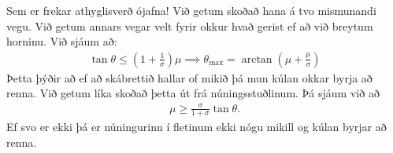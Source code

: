 \ifdefined \wholebook \else\documentclass[oneside]{book}\usepackage{EdlBook}\graphicspath{{figures/}}
\begin{document}
Sem er frekar athyglisverð ójafna! Við getum skoðað hana á tvo mismunandi vegu. Við getum annars vegar velt fyrir okkur hvað gerist ef að við breytum horninu. Við sjáum að:
\begin{align*}
    \tan\theta \leq \left(1+\frac{1}{\sigma}\right)\mu \implies \theta_{\text{max}} = \arctan\left(\mu+\frac{\mu}{\sigma}\right)
\end{align*}
Þetta þýðir að ef að skábrettið hallar of mikið þá mun kúlan okkar byrja að renna. Við getum líka skoðað þetta út frá núningsstuðlinum. Þá sjáum við að
\begin{align*}
    \mu \geq \frac{\sigma}{1+\sigma}\tan\theta.
\end{align*}
Ef svo er ekki þá er núningurinn í fletinum ekki nógu mikill og kúlan byrjar að renna.

\end{document}
